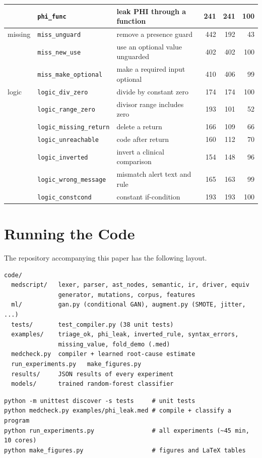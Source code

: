 \documentclass[conference]{IEEEtran}
\begin{document}
\begin{table}[t]
\begin{tabular}{llp{5.2cm}rrr}
 & \texttt{phi\_func} & leak PHI through a function & 241 & 241 & 100\\
\midrule
missing & \texttt{miss\_unguard} & remove a presence guard & 442 & 192 & 43\\
 & \texttt{miss\_new\_use} & use an optional value unguarded & 402 & 402 & 100\\
 & \texttt{miss\_make\_optional} & make a required input optional & 410 & 406 & 99\\
\midrule
logic & \texttt{logic\_div\_zero} & divide by constant zero & 174 & 174 & 100\\
 & \texttt{logic\_range\_zero} & divisor range includes zero & 193 & 101 & 52\\
 & \texttt{logic\_missing\_return} & delete a return & 166 & 109 & 66\\
 & \texttt{logic\_unreachable} & code after return & 160 & 112 & 70\\
 & \texttt{logic\_inverted} & invert a clinical comparison & 154 & 148 & 96\\
 & \texttt{logic\_wrong\_message} & mismatch alert text and rule & 165 & 163 & 99\\
 & \texttt{logic\_constcond} & constant if-condition & 193 & 193 & 100\\
\bottomrule
\end{tabular}
\end{table}

\section{Running the Code}\label{app:run}

The repository accompanying this paper has the following layout.

\begin{lstlisting}[language={}]
code/
  medscript/   lexer, parser, ast_nodes, semantic, ir, driver, equiv
               generator, mutations, corpus, features
  ml/          gan.py (conditional GAN), augment.py (SMOTE, jitter, ...)
  tests/       test_compiler.py (38 unit tests)
  examples/    triage_ok, phi_leak, inverted_rule, syntax_errors,
               missing_value, fold_demo (.med)
  medcheck.py  compiler + learned root-cause estimate
  run_experiments.py   make_figures.py
  results/     JSON results of every experiment
  models/      trained random-forest classifier
\end{lstlisting}

\begin{lstlisting}[language={}]
python -m unittest discover -s tests     # unit tests
python medcheck.py examples/phi_leak.med # compile + classify a program
python run_experiments.py                # all experiments (~45 min, 10 cores)
python make_figures.py                   # figures and LaTeX tables
\end{lstlisting}
\end{document}
